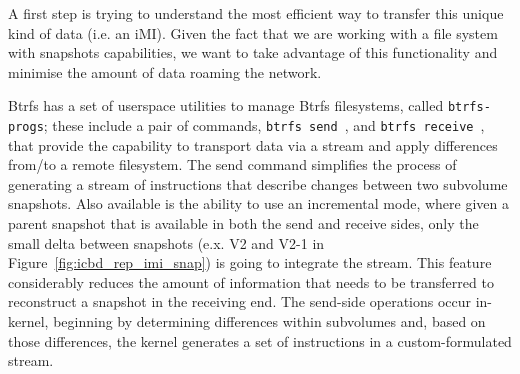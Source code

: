 

A first step is trying to understand the most efficient way to transfer this unique kind of data (i.e. an iMI). Given the fact that we are working with a file system with snapshots capabilities, we want to take advantage of this functionality and minimise the amount of data roaming the network.

Btrfs has a set of userspace utilities to manage Btrfs filesystems, called \texttt{btrfs-progs}; these include a pair of commands, \texttt{btrfs send}~\cite{btrfs_send}, and \texttt{btrfs receive}~\cite{btrfs_receive}, that provide the capability to transport data via a stream and apply differences from/to a remote filesystem. The send command simplifies the process of generating a stream of instructions that describe changes between two subvolume snapshots. Also available is the ability to use an incremental mode, where given a parent snapshot that is available in both the send and receive sides, only the small delta between snapshots (e.x. V2 and V2-1 in Figure~\ref{fig:icbd_rep_imi_snap}) is going to integrate the stream. This feature considerably reduces the amount of information that needs to be transferred to reconstruct a snapshot in the receiving end. The send-side operations occur in-kernel, beginning by determining differences within subvolumes and, based on those differences, the kernel generates a set of instructions in a custom-formulated stream.

